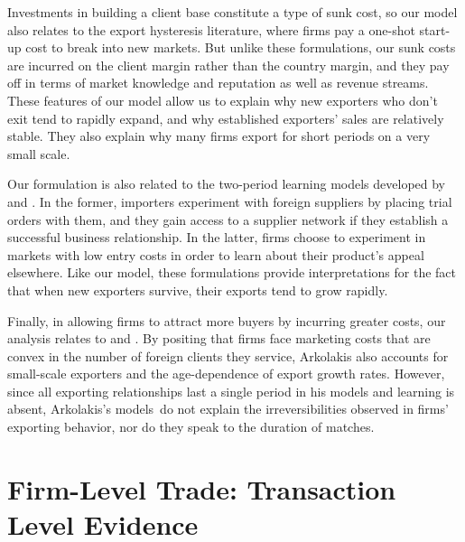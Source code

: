 Investments in building a client base constitute a type of sunk cost, so our
model also relates to the export hysteresis literature, where firms pay a one-shot start-up cost to break into new markets.\citep{baldwin1989persistent, das2007market, dixit1989hysteresis, alessandria2007sunk, alessandria2010inventories}  But unlike these formulations, our sunk costs are incurred
on the client margin rather than the country margin, and they pay off in
terms of market knowledge and reputation as well as revenue streams. These
features of our model allow us to explain why new exporters who don't exit
tend to rapidly expand, and why established exporters' sales are relatively
stable. They also explain why many firms export for short periods on a very
small scale.

Our formulation is also related to the two-period learning models developed
by \citet{rauch2003starting} and \citet{albornoz2012sequential}. In the former,
importers experiment with foreign suppliers by placing trial orders with
them, and they gain access to a supplier network if they establish a
successful business relationship. In the latter, firms choose to experiment
in markets with low entry costs in order to learn about their product's
appeal elsewhere. Like our model, these formulations provide interpretations
for the fact that when new exporters survive, their exports tend to grow
rapidly.\renewcommand{\baselinestretch}{1}\footnotemark{}

Finally, in allowing firms to attract more buyers by incurring greater
costs, our analysis relates to \citet{drozd2012understanding} and \citet{arkolakis2010market}\citep{arkolakis2011unified}. By positing that firms face marketing costs that are convex in the
number of foreign clients they service, Arkolakis also accounts for
small-scale exporters and the age-dependence of export growth rates.
However, since all exporting relationships last a single period in his
models and learning is absent, Arkolakis's models\ do not explain the
irreversibilities observed in firms' exporting behavior, nor do they speak
to the duration of matches.

\section{Firm-Level Trade: Transaction Level Evidence}
\label{sec:data}

